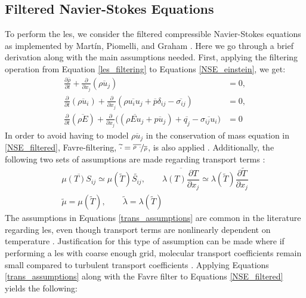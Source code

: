 \subsection{Filtered Navier-Stokes Equations}
To perform the \gls{les}, we consider the filtered compressible Navier-Stokes equations as implemented by Mart\'{i}n, Piomelli, and Graham \cite{LES_Comp}. Here we go through a brief derivation along with the main assumptions needed. First, applying the filtering operation from Equation \ref{les_filtering} to Equations \ref{NSE_einstein}, we get:
\begin{subequations} \label{NSE_filtered}
\begin{align}
  \frac{\partial\overline{\rho}}{\partial t} + \frac{\partial }{\partial x_j} \left( \overline{\rho u_j} \right) &= 0,  \label{mass_filtered} \\
  \frac{\partial}{\partial t} \left( \overline{\rho u_i }\right) + \frac{\partial}{\partial x_j} \left(\overline{\rho u_i u_j} + \overline{p }\delta_{ij} - \overline{\sigma_{ij}} \right) &= 0,  \label{mom_filtered} \\
  \frac{\partial}{\partial t} \left( \overline{\rho E} \right) + \frac{\partial}{\partial x_j} \big(\left( \overline{\rho Eu_j}+\overline{p u_j} \right) + \overline{q_j} - \overline{\sigma_{ij} u_i}\big) &= 0 \label{en_filtered}
\end{align}
\end{subequations}
In order to avoid having to model $\overline{\rho u_j} $ in the conservation of mass equation in \ref{NSE_filtered}, Favre-filtering, $\widetilde{\cdot}  = \nicefrac{\overline{\rho~\cdot}}{\overline{\rho}}$, is also applied \cite{favre}. Additionally, the following two sets of assumptions are made regarding transport terms \cite{PIOMELLI202183}:
\begin{subequations} \label{trans_assumptions}
\begin{align}
\overline{\mu(T)S_{ij}} \simeq \mu(\widetilde{T})\widetilde{S_{ij}}, \quad \quad 
\overline{\lambda(T)\dfrac{\partial T}{\partial x_j}} \simeq \lambda(\widetilde{T})\dfrac{ \partial \widetilde{T}}{\partial x_j} \label{trans_1}\\
\widetilde{\mu} = \mu(\widetilde{T}), \quad \quad \widetilde{\lambda} = \lambda(\widetilde{T}) \label{trans_2}
\end{align}
\end{subequations}
The assumptions in Equations \ref{trans_assumptions} are common in the literature regarding \gls{les}, even though transport terms are nonlinearly dependent on temperature \cite{PIOMELLI202183}. Justification for this type of assumption can be made where if performing a \gls{les} with coarse enough grid, molecular transport coefficients remain small compared to turbulent transport coefficients \cite{}. Applying Equations \ref{trans_assumptions} along with the Favre filter to Equations \ref{NSE_filtered} yields the following:
